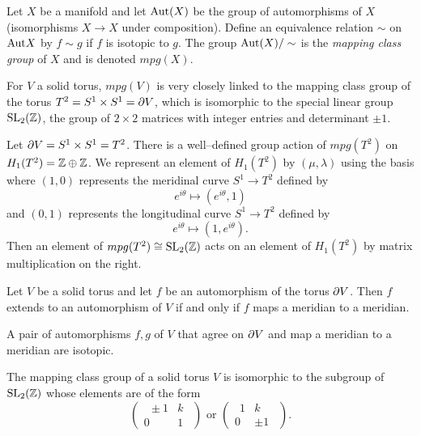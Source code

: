 \begin{defn}
	Let $X$ be a manifold and let $\textrm{Aut} (X)$ be the group of automorphisms of $X$ (isomorphisms $X\to X$ under composition).
	Define an equivalence relation $\sim$ on $\textrm{Aut} X$ by $f\sim g$ if $f$ is isotopic to $g$.
	The group $\textrm{Aut}(X)/\sim$ is the \emph{mapping class group} of $X$ and is denoted $mpg(X)$.
\end{defn}

For $V$ a solid torus, $mpg(V)$ is very closely linked to the mapping class group of the torus $T^2 = S^1\times S^1=\partial V$, which is isomorphic to the special linear group $\textrm{SL}_2(\mathbb{Z})$, the group of $2\times 2$ matrices with integer entries and determinant $\pm 1$.

Let $\partial V=S^1\times S^1=T^2$.
There is a well--defined group action of $mpg(T^2)$ on $H_1(T^2)=\mathbb{Z}\oplus\mathbb{Z}$.
We represent an element of $H_1(T^2)$ by $(\mu,\lambda)$ using the basis where $(1,0)$ represents the meridinal curve $S^1\to T^2$ defined by
\[
	e^{i\theta}\mapsto(e^{i\theta},1)
\]
and $(0,1)$ represents the longitudinal curve $S^1\to T^2$ defined by
\[
	e^{i\theta}\mapsto(1,e^{i\theta}).
\]
Then an element of $mpg(T^2)\cong \textrm{SL}_2(\mathbb{Z})$ acts on an element of $H_1(T^2)$ by matrix multiplication on the right.

\begin{lem}
	Let $V$ be a solid torus and let $f$ be an automorphism of the torus $\partial V$.
	Then $f$ extends to an automorphism of $V$ if and only if $f$ maps a meridian to a meridian.	
\end{lem}

\begin{lem}
	A pair of automorphisms $f,g$ of $V$ that agree on $\partial V$ and map a meridian to a meridian are isotopic.	
\end{lem}

\begin{theorem}
	\label{thm:mpgV}
	The mapping class group of a solid torus $V$ is isomorphic to the subgroup of $\textrm{SL}_2(\mathbb{Z})$ whose elements are of the form
	\[
		\begin{pmatrix}
			\:\:\pm 1 & k \\ 0 & 1\:\:
		\end{pmatrix}
		\textrm{ or }
		\begin{pmatrix}
			\:\:1 & k \\ 0 & \pm 1\:\:
		\end{pmatrix}.
	\]
\end{theorem}

